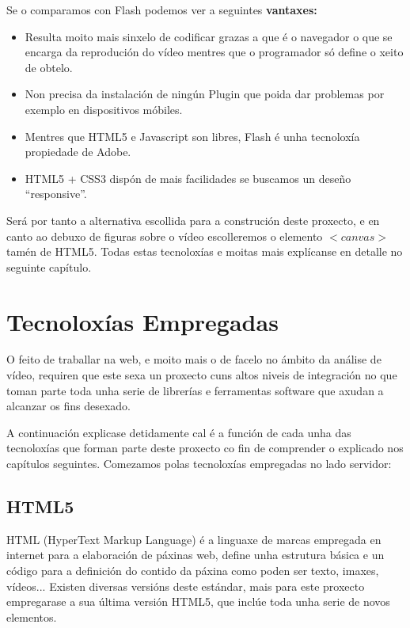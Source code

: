 		Se o comparamos con Flash podemos ver a seguintes \textbf{vantaxes:}
		\begin{itemize}
            \item Resulta moito mais sinxelo de codificar grazas a que é o navegador o que se 
            encarga da reprodución do vídeo mentres que o programador só define o xeito de obtelo.
            \item Non precisa da instalación de ningún Plugin que poida dar problemas por exemplo 
            en dispositivos móbiles.
            \item Mentres que HTML5 e Javascript son libres, Flash é unha tecnoloxía propiedade de 
            Adobe.
            \item HTML5 + CSS3 dispón de mais facilidades se buscamos un deseño ``responsive''.
        \end{itemize}

		Será por tanto a alternativa escollida para a construción deste proxecto, e en canto ao 
		debuxo de figuras sobre o vídeo escolleremos o elemento $<canvas>$ tamén de HTML5. Todas
		estas tecnoloxías e moitas mais explícanse en detalle no seguinte capítulo.
		
		
\chapter{Tecnoloxías Empregadas}
    
    O feito de traballar na web, e moito mais o de facelo no ámbito da análise de vídeo, requiren 
    que este sexa un proxecto cuns altos niveis de integración no que toman parte toda unha serie 
    de librerías e ferramentas software que axudan a alcanzar os fins desexado.
    
    A continuación explicase detidamente cal é a función de cada unha das tecnoloxías que forman 
    parte deste proxecto co fin de comprender o explicado nos capítulos seguintes. Comezamos polas
    tecnoloxías empregadas no lado servidor:
    
    \section{HTML5}
        HTML (HyperText Markup Language) é a linguaxe de marcas empregada en internet para a elaboración
        de páxinas web, define unha estrutura básica e un código para a definición do contido da páxina
        como poden ser texto, imaxes, vídeos... Existen diversas versións deste estándar, mais para este
        proxecto empregarase a sua última versión HTML5, que inclúe toda unha serie de novos elementos.
        
